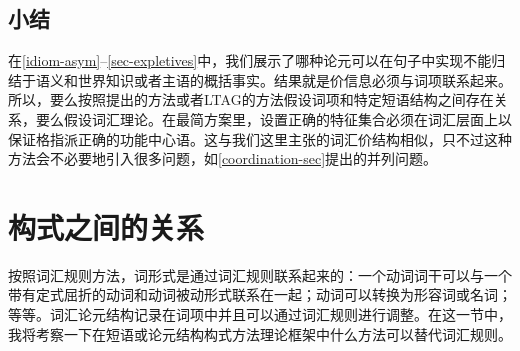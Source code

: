 \begin{exe}
\begin{xlist}[iv.]
\begin{exe}
\begin{xlist}[iv.]
\subsection{小结}
\label{sec-underspec-summary}

在\ref{idiom-asym}--\ref{sec-expletives}中，我们展示了哪种论元可以在句子中实现不能归结于语义和世界知识或者主语的概括事实。结果就是价信息必须与词项联系起来。所以，要么按照\citeyearpar{Croft2003a}提出的方法或者LTAG的方法假设词项和特定短语结构之间存在关系，要么假设词汇理论。在最简方案里，设置正确的特征集合必须在词汇层面上以保证格指派正确的功能中心语。这与我们这里主张的词汇价结构相似，只不过这种方法会不必要地引入很多问题，如\ref{coordination-sec}提出的并列问题。

\section{构式之间的关系}
\label{relations-sec}
按照词汇规则方法，词形式是通过词汇规则联系起来的：一个动词词干可以与一个带有定式屈折的动词和动词被动形式联系在一起；动词可以转换为形容词或名词；等等。词汇论元结构记录在词项中并且可以通过词汇规则进行调整。在这一节中，我将考察一下在短语或论元结构构式方法理论框架中什么方法可以替代词汇规则。


\end{xlist}
\end{exe}
\end{xlist}
\end{exe}
